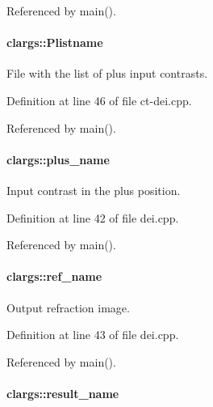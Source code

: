 Referenced by main().

\hypertarget{structclargs_ad5975cc5573e851686be6a5863a2f953}{
\paragraph[{Plistname}]{ {\bf clargs::Plistname}}\hfill}
\label{structclargs_ad5975cc5573e851686be6a5863a2f953}


File with the list of plus input contrasts. 



Definition at line 46 of file ct-\/dei.cpp.



Referenced by main().

\hypertarget{structclargs_acb00f5d12f5dd85809edebb2071693b7}{
\paragraph[{plus\_\-name}]{ {\bf clargs::plus\_\-name}}\hfill}
\label{structclargs_acb00f5d12f5dd85809edebb2071693b7}


Input contrast in the plus position. 



Definition at line 42 of file dei.cpp.



Referenced by main().

\hypertarget{structclargs_a9f69d5325017a6fbbf567588bee36653}{
\paragraph[{ref\_\-name}]{ {\bf clargs::ref\_\-name}}\hfill}
\label{structclargs_a9f69d5325017a6fbbf567588bee36653}


Output refraction image. 



Definition at line 43 of file dei.cpp.



Referenced by main().

\hypertarget{structclargs_ab616d9618e9a08b78d6205db44b72c1e}{
\paragraph[{result\_\-name}]{ {\bf clargs::result\_\-name}}\hfill}
\label{structclargs_ab616d9618e9a08b78d6205db44b72c1e}


